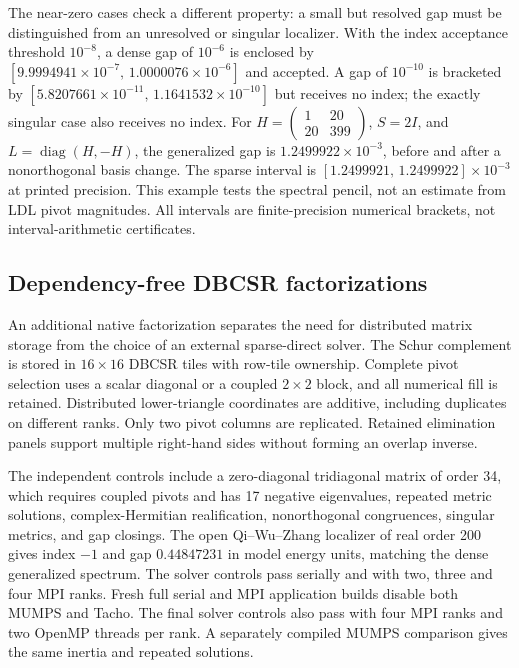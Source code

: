 \documentclass[11pt]{article}
\begin{document}
The near-zero cases check a different property: a small but resolved
gap must be distinguished from an unresolved or singular localizer.
With the index acceptance threshold $10^{-8}$, a dense gap of
$10^{-6}$ is enclosed by
$[9.9994941\times10^{-7},\,1.0000076\times10^{-6}]$ and accepted.
A gap of $10^{-10}$ is bracketed by
$[5.8207661\times10^{-11},\,1.1641532\times10^{-10}]$ but receives
no index; the exactly singular case also receives no index.
For $H=\left(\begin{smallmatrix}1&20\\20&399\end{smallmatrix}\right)$,
$S=2I$, and $L=\operatorname{diag}(H,-H)$, the generalized gap is
$1.2499922\times10^{-3}$, before and after a nonorthogonal basis
change. The sparse interval is
$[1.2499921,\,1.2499922]\times10^{-3}$ at printed precision.
This example tests the spectral pencil, not an estimate from LDL
pivot magnitudes. All intervals are finite-precision numerical
brackets, not interval-arithmetic certificates.

\subsection{Dependency-free DBCSR factorizations}
An additional native factorization separates the need for distributed
matrix storage from the choice of an external sparse-direct solver.
The Schur complement is stored in $16\times16$ DBCSR tiles with
row-tile ownership. Complete pivot selection uses a scalar diagonal
or a coupled $2\times2$ block, and all numerical fill is retained.
Distributed lower-triangle coordinates are additive, including
duplicates on different ranks. Only two pivot columns are replicated.
Retained elimination panels support multiple right-hand sides without
forming an overlap inverse.

The independent controls include a zero-diagonal tridiagonal matrix
of order 34, which requires coupled pivots and has 17 negative
eigenvalues, repeated metric solutions, complex-Hermitian
realification, nonorthogonal congruences, singular metrics, and
gap closings. The open Qi--Wu--Zhang localizer of real order 200
gives index $-1$ and gap $0.44847231$ in model energy units, matching
the dense generalized spectrum. The solver controls pass serially
and with two, three and four MPI ranks. Fresh full serial and MPI
application builds disable both MUMPS and Tacho. The final solver
controls also pass with four MPI ranks and two OpenMP threads per
rank. A separately compiled MUMPS comparison gives the same
inertia and repeated solutions.
\end{document}
